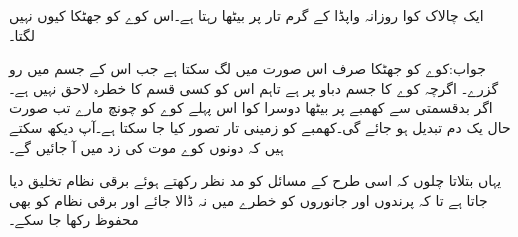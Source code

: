 ایک چالاک کوا روزانہ واپڈا کے   گرم تار پر بیٹھا رہتا ہے۔اس کوے کو جھٹکا کیوں نہیں لگتا۔

جواب:کوے کو جھٹکا صرف اس صورت میں لگ سکتا ہے جب اس کے جسم میں رو گزرے۔ اگرچہ کوے کا جسم  دباو پر ہے تاہم اس کو کسی قسم کا خطرہ لاحق نہیں ہے۔اگر بدقسمتی سے کھمبے پر بیٹھا دوسرا کوا اس پہلے کوے کو چونچ مارے تب صورت حال یک دم تبدیل ہو جائے گی۔کھمبے کو زمینی تار تصور کیا جا سکتا ہے۔آپ دیکھ سکتے ہیں کہ دونوں کوے موت کی زد میں آ جائیں گے۔

یہاں بتلاتا چلوں کہ اسی طرح کے مسائل کو مد نظر رکھتے ہوئے برقی نظام  تخلیق دیا جاتا ہے تا کہ پرندوں اور جانوروں کو خطرے  میں نہ ڈالا جائے اور برقی نظام کو بھی محفوظ رکھا جا سکے۔
